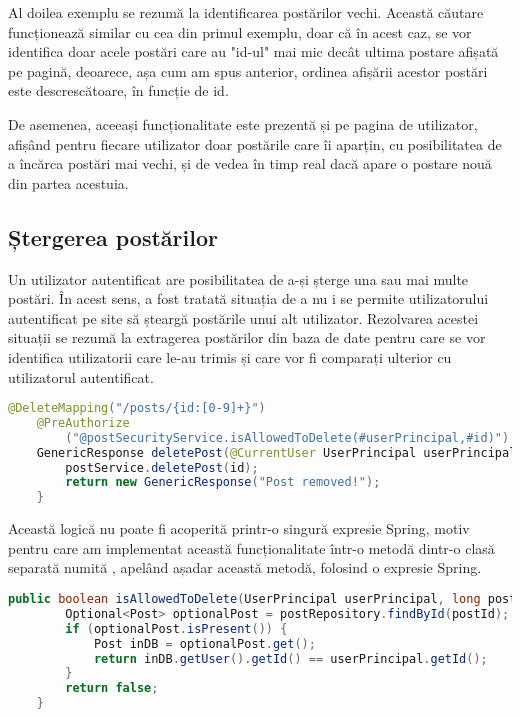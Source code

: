 Al doilea exemplu se rezumă la identificarea postărilor vechi. Această căutare funcționează similar cu cea din primul exemplu, doar că în acest caz, se vor identifica doar acele postări care au "id-ul" mai mic decât ultima postare afișată pe pagină, deoarece, așa cum am spus anterior, ordinea afișării acestor postări este descrescătoare, în funcție de id.\newline

De asemenea, aceeași funcționalitate este prezentă și pe pagina de utilizator, afișând pentru fiecare utilizator doar postările care îi aparțin, cu posibilitatea de a încărca postări mai vechi, și de vedea în timp real dacă apare o postare nouă din partea acestuia.\newline

\subsection{Ștergerea postărilor}

Un utilizator autentificat are posibilitatea de a-și șterge una sau mai multe postări. În acest sens, a fost tratată situația de a nu i se permite utilizatorului autentificat pe site să șteargă postările unui alt utilizator. Rezolvarea acestei situații se rezumă la extragerea postărilor din baza de date pentru care se vor identifica utilizatorii care le-au trimis și care vor fi comparați ulterior cu utilizatorul autentificat.\newline

\begin{lstlisting}[language=Java]
	@DeleteMapping("/posts/{id:[0-9]+}")
	@PreAuthorize
		("@postSecurityService.isAllowedToDelete(#userPrincipal,#id)")
	GenericResponse deletePost(@CurrentUser UserPrincipal userPrincipal, @PathVariable long id) {
		postService.deletePost(id);
		return new GenericResponse("Post removed!");
	}
\end{lstlisting}
\bigskip

Această logică nu poate fi acoperită printr-o singură expresie Spring, motiv pentru care am implementat această funcționalitate într-o metodă dintr-o clasă separată numită , apelând așadar această metodă, folosind o expresie Spring.\newline

\begin{lstlisting}[language=Java]
	public boolean isAllowedToDelete(UserPrincipal userPrincipal, long postId) {
		Optional<Post> optionalPost = postRepository.findById(postId);
		if (optionalPost.isPresent()) {
			Post inDB = optionalPost.get();
			return inDB.getUser().getId() == userPrincipal.getId();
		}
		return false;
	}
\end{lstlisting}
\bigskip

